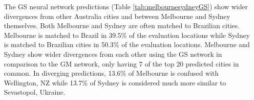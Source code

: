 \documentclass[10pt,letterpaper,hidelinks]{article}
\begin{document}
\begin{table}[!htbp]
\begin{adjustwidth}{-2.25in}{0in}
\begin{tabular}{ l l l l l}
\hline
\end{tabular}
\end{adjustwidth}
\end{table}

The GS neural network predictions (Table \ref{tab:melbournesydneyGS}) show wider divergences from other Australia cities and between Melbourne and Sydney themselves. Both Melbourne and Sydney are often matched to Brazilian cities. Melbourne is matched to Brazil in 39.5\% of the evaluation locations while Sydney is matched to Brazilian cities in 50.3\% of the evaluation locations. Melbourne and Sydney show wider divergences from each other using the GS network in comparison to the GM network, only having 7 of the top 20 predicted cities in common. In diverging predictions, 13.6\% of Melbourne is confused with Wellington, NZ while 13.7\% of Sydney is considered much more similar to Sevastopol, Ukraine. 
\end{document}
